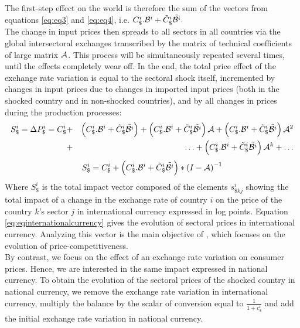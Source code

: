 \documentclass[11pt,a4paper]{paper} %
\begin{document}
The first-step effect on the world is therefore the sum of the vectors from equations \ref{eq:eq3} and \ref{eq:eq4}, i.e. $C_\$^i.{\cal B}^i+{\tilde{C}_\$^i}{\tilde{{\cal B}^i}}.~$\\
The change in input prices then spreads to all sectors in all countries via the global intersectoral exchanges transcribed by the matrix of technical coefficients of large matrix $\cal {A}$. This process will be simultaneously repeated several times, until the effects completely wear off.
In the end, the total price effect of the exchange rate variation is equal to the sectoral shock itself, incremented by changes in input prices due to changes in imported input prices (both in the shocked country and in non-shocked countries), and by all changes in prices during the production processes:\\
\begin{eqnarray*}
S_\$^i = \Delta{{P}_{\$}^i}=C_\$^i&+& \left(C_\$^i.{\cal B}^i+{\tilde{C}_\$^i}{\tilde{{\cal B}^ i}}\right)+ \left(C_\$^i.{\cal B}^i+{\tilde{C}_\$^i}{\tilde{{\cal B}^i}}\right){{\cal A}}+\left(C_\$^i.{\cal B}^i+{\tilde{C}_\$^i}{\tilde{{\cal B}^i}}\right){{\cal A}^{2}} \\
&+&\ldots+\left(C_\$^i.{\cal B}^i+{\tilde{C}_\$^i}{\tilde{{\cal B}^i}}\right){\cal A}^k +\ldots \\
\end{eqnarray*}
 \begin{eqnarray}
S_\$^i=C_\$^i+\left(C_\$^i.{\cal B}^i+{\tilde{C}_\$^i}{\tilde{{\cal B}^i}}\right)*{{(I-{\cal A})}^{-1}}	
\label{eq:eqinternationalcurrency}
 \end{eqnarray}
Where $S_\$^i$ is the total impact vector composed of the elements ${{{s}}^i_{\$kj}}$ showing the total impact of a change in the exchange rate of country $i$ on the price of the country $k$'s sector $j$ in international currency expressed in log points. 
Equation \ref{eq:eqinternationalcurrency} gives the evolution of sectoral prices in international currency. Analyzing this vector is the main objective of \cite{Cochard2016}, which focuses on the evolution of price-competitiveness.\\
By contrast, we focus on the effect of an exchange rate variation on consumer prices. Hence, we are interested in the same impact expressed in national currency. To obtain the evolution of the sectoral prices of the shocked country in national currency, we remove the exchange rate variation in international currency, multiply the balance by the scalar of conversion equal to $\frac{1}{1+c_\$^i}$ and add the initial exchange rate variation in national currency.
\end{document}
